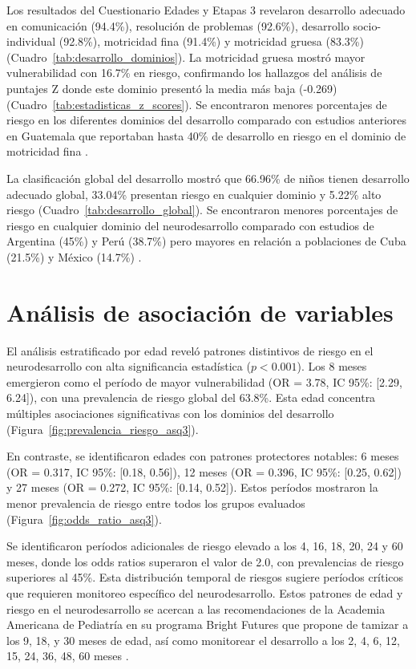 Los resultados del Cuestionario Edades y Etapas 3 revelaron desarrollo adecuado
en comunicación (94.4\%),  resolución de problemas (92.6\%), desarrollo
socio-individual (92.8\%),  motricidad fina (91.4\%) y motricidad gruesa
(83.3\%)  (Cuadro~\ref{tab:desarrollo_dominios}). La motricidad gruesa mostró
mayor  vulnerabilidad con 16.7\% en riesgo, confirmando los hallazgos del
análisis de puntajes Z donde este dominio presentó la media más baja (-0.269) 
(Cuadro~\ref{tab:estadisticas_z_scores}). Se encontraron menores porcentajes de riesgo en los diferentes dominios del desarrollo comparado con estudios anteriores en Guatemala que reportaban hasta 40\% de desarrollo en riesgo en el dominio de motricidad fina \cite{Angulo2023}.

La clasificación global del desarrollo mostró que 66.96\% de niños tienen 
desarrollo adecuado global, 33.04\% presentan riesgo en cualquier dominio y 
5.22\% alto riesgo (Cuadro~\ref{tab:desarrollo_global}). Se encontraron menores porcentajes de riesgo en cualquier dominio del neurodesarrollo comparado con estudios de Argentina (45\%) y Perú (38.7\%) pero mayores en relación a poblaciones de Cuba (21.5\%) y México (14.7\%)
\cite{GuadarramaCelaya2011,Kyerematen2014,CarlosOliva2020,RicardoGarcell2022}.

\section{Análisis de asociación de variables}
El análisis estratificado por edad reveló patrones distintivos de riesgo en el 
neurodesarrollo con alta significancia estadística ($p<0.001$). Los 8 meses 
emergieron como el período de mayor vulnerabilidad (OR = 3.78, IC 95\%: 
[2.29, 6.24]), con una prevalencia de riesgo global del 63.8\%. Esta edad 
concentra múltiples asociaciones significativas con los dominios del desarrollo
(Figura~\ref{fig:prevalencia_riesgo_asq3}).

En contraste, se identificaron edades con patrones protectores notables: 6 meses 
(OR = 0.317, IC 95\%: [0.18, 0.56]), 12 meses (OR = 0.396, IC 95\%: [0.25, 0.62]) 
y 27 meses (OR = 0.272, IC 95\%: [0.14, 0.52]). Estos períodos mostraron la 
menor prevalencia de riesgo entre todos los grupos evaluados
(Figura~\ref{fig:odds_ratio_asq3}).

Se identificaron períodos adicionales de riesgo elevado a los 4, 16, 18, 20, 24 
y 60 meses, donde los odds ratios superaron el valor de 2.0, con prevalencias 
de riesgo superiores al 45\%. Esta distribución temporal de riesgos sugiere 
períodos críticos que requieren monitoreo específico del neurodesarrollo.
Estos patrones de edad y riesgo en el neurodesarrollo se acercan a las
recomendaciones de la Academia Americana de Pediatría en su programa Bright
Futures que propone de tamizar a los 9, 18, y 30 meses de edad, así como monitorear el desarrollo a los 2, 4, 6, 12, 15, 24, 36, 48, 60 meses \cite{Lipkin2020}. 

